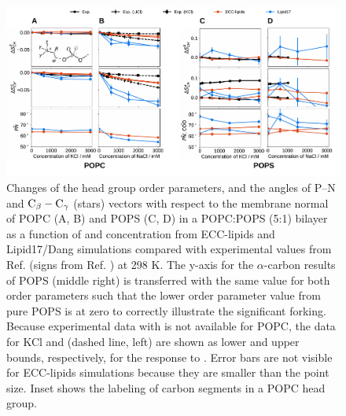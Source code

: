 \documentclass[journal=jpcbfk,manuscript=article]{achemso}
\newlength{\figwidth}
\newlength{\figwidthfull}
\begin{document}
\begin{figure}[tbp!] 
  \centering 
  \includegraphics[width=\figwidthfull]{../img/deltaOP_nacl_kcl_PC-PS.pdf} 
  \caption{\label{fig:delta_ordPar_monoval_PCPS}
    Changes of the head group order parameters, and the angles of P--N and ${\rm{C}}_\beta-{\rm{C}}_\gamma$ (stars) vectors
    with respect to the membrane normal of POPC (A, B) and POPS (C, D) in a POPC:POPS (5:1) bilayer 
    as a function of  and  concentration from ECC-lipids and Lipid17/Dang simulations 
    compared with experimental values from Ref.  (signs from Ref. ) at 298 K.
    The y-axis for the $\alpha$-carbon results of POPS (middle right) is transferred
    with the same value for both order parameters such that the lower order
    parameter value from pure POPS is at zero to correctly illustrate the significant forking.
    Because experimental data with  is not available for POPC, the data for KCl and  (dashed line, left)
    are shown as lower and upper bounds, respectively, for the response to . 
    Error bars are not visible for ECC-lipids simulations because they are smaller than the point size.
    Inset shows the labeling of carbon segments in a POPC head group.}
\end{figure} 
\end{document}

